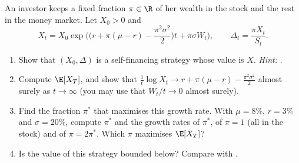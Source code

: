 
\begin{exercise}\label{ex:dh-proportion}
\easy An investor keeps a fixed fraction $\pi\in\R$ of her wealth in the stock and the rest in
the money market. Let $X_0>0$ and
\[
  X_t=X_0\exp\Big(\Big(r+\pi(\mu-r)-\frac{\pi^2\sigma^2}{2}\Big)t+\pi\sigma W_t\Big),\qquad
  \Delta_t=\frac{\pi X_t}{S_t}.
\]
\begin{enumerate}[label=(\alph*)]
  \item Show that $(X_0,\Delta)$ is a self-financing strategy whose value is $X$. \emph{Hint:}
    .
  \item Compute $\E[X_T]$, and show that $\frac1t\log X_t\to r+\pi(\mu-r)-\frac{\pi^2\sigma^2}{2}$
    almost surely as $t\to\infty$ (you may use that $W_t/t\to0$ almost surely).
  \item Find the fraction $\pi^*$ that maximises this growth rate. With $\mu=8\%$, $r=3\%$ and
    $\sigma=20\%$, compute $\pi^*$ and the growth rates of $\pi^*$, of $\pi=1$ (all in the stock)
    and of $\pi=2\pi^*$. Which $\pi$ maximises $\E[X_T]$?
  \item Is the value of this strategy bounded below? Compare with .
\end{enumerate}
\end{exercise}

